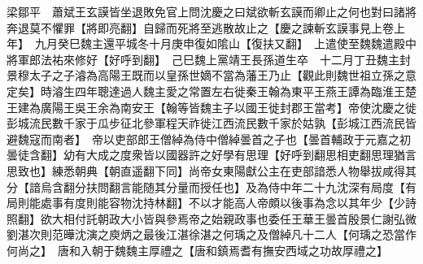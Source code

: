 梁鄒平　蕭斌王玄謨皆坐退敗免官上問沈慶之曰斌欲斬玄謨而卿止之何也對曰諸將奔退莫不懼罪【將即亮翻】自歸而死將至逃散故止之【慶之諫斬玄謨事見上卷上年】　九月癸巳魏主還平城冬十月庚申復如隂山【復扶又翻】　上遣使至魏魏遣殿中將軍郎法祐來修好【好呼到翻】　己巳魏上黨靖王長孫道生卒　十二月丁丑魏主封景穆太子之子濬為高陽王既而以皇孫世嫡不當為藩王乃止【觀此則魏世祖立孫之意定矣】時濬生四年聰達過人魏主愛之常置左右徙秦王翰為東平王燕王譚為臨淮王楚王建為廣陽王吳王余為南安王【翰等皆魏主子以國王徙封郡王當考】帝使沈慶之徙彭城流民數千家于瓜步征北參軍程天祚徙江西流民數千家於姑孰【彭城江西流民皆避魏寇而南者】　帝以吏部郎王僧綽為侍中僧綽曇首之子也【曇首輔政于元嘉之初曇徒含翻】幼有大成之度衆皆以國器許之好學有思理【好呼到翻思相吏翻思理猶言思致也】練悉朝典【朝直遥翻下同】尚帝女東陽獻公主在吏部諳悉人物舉拔咸得其分【諳烏含翻分扶問翻言能随其分量而授任也】及為侍中年二十九沈深有局度【有局則能處事有度則能容物沈持林翻】不以才能高人帝頗以後事為念以其年少【少詩照翻】欲大相付託朝政大小皆與參焉帝之始親政事也委任王華王曇首殷景仁謝弘微劉湛次則范曄沈演之庾炳之最後江湛徐湛之何瑀之及僧綽凡十二人【何瑀之恐當作何尚之】　唐和入朝于魏魏主厚禮之【唐和鎮焉耆有撫安西域之功故厚禮之】

